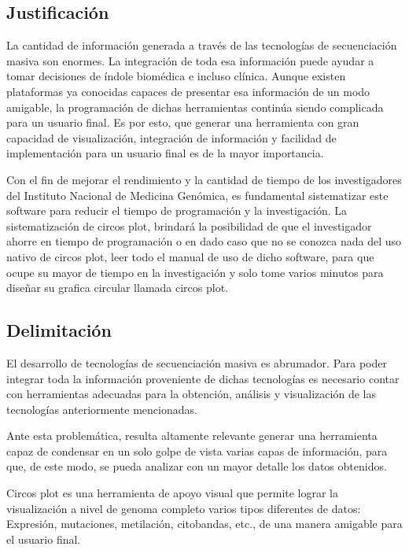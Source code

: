 \documentclass[12pt,letterpaper]{article}
\begin{document}
\subsection{Justificación}
La cantidad de información generada a través de las tecnologías de secuenciación masiva son enormes. La integración de toda esa información puede ayudar a tomar decisiones de índole biomédica e incluso clínica. 
Aunque existen plataformas ya conocidas capaces de presentar esa información de un modo amigable, la programación de dichas herramientas continúa siendo complicada para un usuario final. Es por esto, que generar una herramienta con gran capacidad de visualización, integración de información y facilidad de implementación para un usuario final es de la mayor importancia. 

Con el fin de mejorar el rendimiento y la cantidad de tiempo de los investigadores del Instituto Nacional de Medicina Genómica, es fundamental sistematizar este software para reducir el tiempo de programación y la investigación.
La sistematización 	de circos plot, brindará la posibilidad de que el investigador ahorre en tiempo de programación o en dado caso que no se conozca nada del uso nativo de circos plot, leer todo el manual de uso de dicho software, para que ocupe su mayor de tiempo en la investigación y solo tome varios minutos para diseñar su grafica circular llamada circos plot.


\subsection{Delimitación}
El desarrollo de tecnologías de secuenciación masiva es abrumador. Para poder integrar toda la información proveniente de dichas tecnologías es necesario contar con herramientas adecuadas para la obtención, análisis y visualización de las tecnologías anteriormente mencionadas.

Ante esta problemática, resulta altamente relevante generar una herramienta capaz de condensar en un solo golpe de vista varias capas de información, para que, de este modo, se pueda analizar con un mayor detalle los datos obtenidos.

Circos plot es una herramienta de apoyo visual que permite lograr la visualización a nivel de genoma completo varios tipos diferentes de datos: Expresión, mutaciones, metilación, citobandas, etc., de una manera amigable para el usuario final. 
\end{document}
